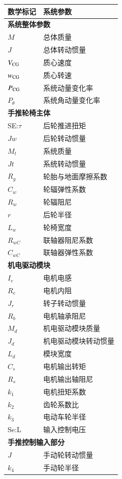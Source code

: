 \begin{table}[H]
\footnotesize
\caption{系统主要参数及其数学标记}\label{tab:param}
\begin{longtable}{l|l}
	\toprule
	\textbf{数学标记} & \textbf{系统参数}\\
	\midrule
	\endhead
	\multicolumn{2}{l}{\textbf{系统整体参数}} \\ %
	\midrule
	$ M $ & 总体质量\\
	$ J $ & 总体转动惯量\\
	$ V_{\rm{CG}} $ & 质心速度\\
	$ w_{\rm{CG}} $ & 质心转速\\
	$ P_{\rm{CG}} $ & 系统动量变化率\\
	$ P_{\theta} $ & 系统角动量变化率\\
	\midrule
	\multicolumn{2}{l}{\textbf{手推轮椅主体}} \\
	\midrule
	SE:$\tau$ & 后轮推进扭矩 \\
	$ J w $ & 后轮转动惯量\\
	$ M_t $ & 系统质量\\
	$ J t $ & 系统转动惯量\\
	$ R_g $ & 轮胎与地面摩擦系数\\
	$ C_w $ & 轮辐弹性系数\\
	$ R_w $ & 轮辐阻尼\\
	$ r $ & 后轮半径\\
	$ L_w $ & 轮椅宽度\\
	$ R_{wC} $ & 联轴器阻尼系数\\
	$ C_{wC} $ & 联轴器弹性系数\\
	\midrule
	\multicolumn{2}{l}{\textbf{机电驱动模块}} \\
	\midrule
	$ I_e $ & 电机电感\\
	$ R_e $ & 电机内阻\\
	$ J_r $ & 转子转动惯量\\
	$ R_b $ & 电机轴承阻尼\\
	$ M_d $ & 机电驱动模块质量\\
	$ J_d $ & 机电驱动模块转动惯量\\
	$ L_d $ & 模块宽度\\
	$ C_s $ & 电机输出转矩\\
	$ R_s $ & 电机输出轴阻尼\\
	$ k_1 $ & 电机扭矩系数\\ %
	$ k_2 $ & 齿轮系数比\\ %
	$ k_3 $ & 电动车轮半径 \\ %
	Se:L & 输入控制电压\\
	\midrule
	\multicolumn{2}{l}{\textbf{手推控制输入部分}}\\
	\midrule
	$ J $ & 手动轮转动惯量\\
	$ k_4 $ & 手动轮半径\\ %
	\bottomrule
\end{longtable}
\end{table}